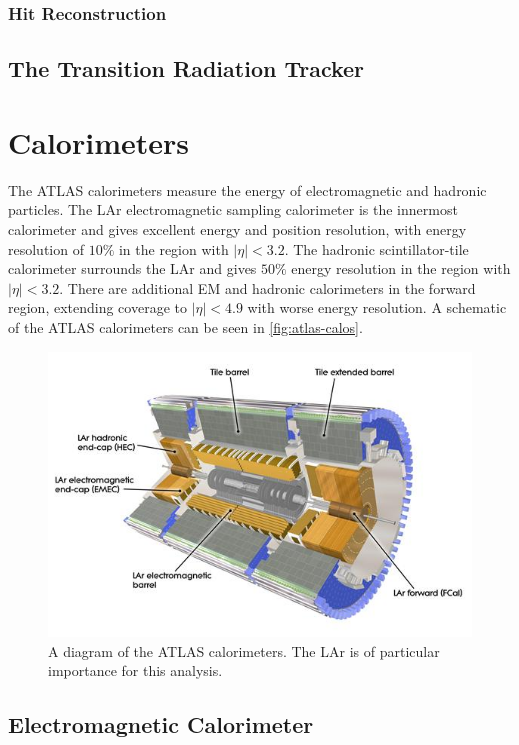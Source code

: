 \subsubsection{Hit Reconstruction}
\subsection{The Transition Radiation Tracker}


\section{Calorimeters}

The \ac{ATLAS} calorimeters measure the energy of electromagnetic and hadronic particles. The \ac{LAr} electromagnetic sampling calorimeter is the innermost calorimeter and gives excellent energy and position resolution, with energy resolution of $10\%$ in the region with $|\eta| < 3.2$. The hadronic scintillator-tile calorimeter surrounds the \ac{LAr} and gives $50\%$ energy resolution in the region with $|\eta| < 3.2$. There are additional \ac{EM} and hadronic calorimeters in the forward region, extending coverage to $|\eta| < 4.9$ with worse energy resolution. A schematic of the \ac{ATLAS} calorimeters can be seen in \autoref{fig:atlas-calos}. 


\begin{figure}[htbp]
\centering
\includegraphics[width=.8\textwidth]{figures/Detector/atlas-calorimeters.jpg}
\caption{A diagram of the \ac{ATLAS} calorimeters. The \ac{LAr} is of particular importance for this analysis.}
\label{fig:atlas-calos}
\end{figure}


\subsection{Electromagnetic Calorimeter}

